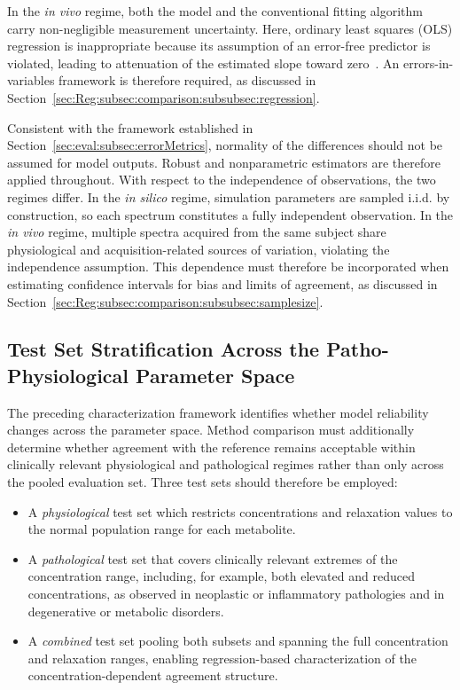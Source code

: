 In the \textit{in vivo} regime, both the \DL model and the conventional fitting algorithm carry non-negligible measurement uncertainty. Here, ordinary least squares (OLS) regression is inappropriate because its assumption of an error-free predictor is violated, leading to attenuation of the estimated slope toward zero~\cite{Riu1997}. An errors-in-variables framework is therefore required, as discussed in Section~\ref{sec:Reg:subsec:comparison:subsubsec:regression}.

Consistent with the framework established in Section~\ref{sec:eval:subsec:errorMetrics}, normality of the differences should not be assumed for \DL model outputs. Robust and nonparametric estimators are therefore applied throughout. With respect to the independence of observations, the two regimes differ. In the \textit{in silico} regime, simulation parameters are sampled i.i.d. by construction, so each spectrum constitutes a fully independent observation. In the \textit{in vivo} regime, multiple spectra acquired from the same subject share physiological and acquisition-related sources of variation, violating the independence assumption. This dependence must therefore be incorporated when estimating confidence intervals for bias and limits of agreement, as discussed in Section~\ref{sec:Reg:subsec:comparison:subsubsec:samplesize}.

\subsection{Test Set Stratification Across the Patho-Physiological Parameter Space}
\label{sec:Reg:subsec:comparison:subsubsec:stratification}
The preceding characterization framework identifies whether model reliability changes across the parameter space. Method comparison must additionally determine whether agreement with the reference remains acceptable within clinically relevant physiological and pathological regimes rather than only across the pooled evaluation set. Three test sets should therefore be employed: 
\begin{itemize}
    \item A \textit{physiological} test set which restricts concentrations and relaxation values to the normal population range for each metabolite.
    \item A \textit{pathological} test set that covers clinically relevant extremes of the concentration range, including, for example, both elevated and reduced concentrations, as observed in neoplastic or inflammatory pathologies and in degenerative or metabolic disorders.
    \item A \textit{combined} test set pooling both subsets and spanning the full concentration and relaxation rang\-es, enabling regression-based characterization of the concentration-dependent agreement structure.
\end{itemize}

